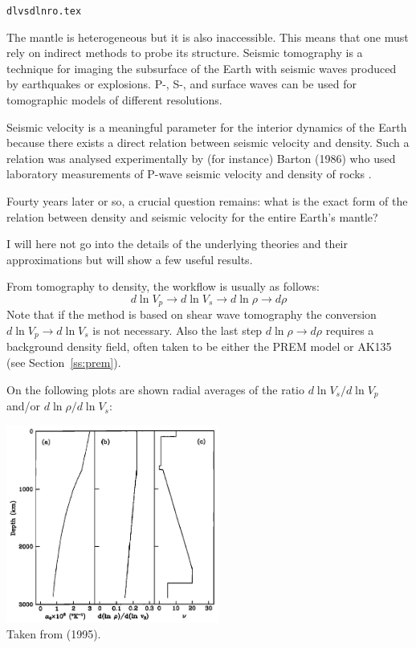 \begin{flushright} {\tiny {\color{gray} \tt dlvsdlnro.tex}} \end{flushright}

The mantle is heterogeneous but it is also inaccessible. This means that 
one must rely on indirect methods 
to probe its structure. Seismic tomography is a technique for imaging 
the subsurface of the Earth with seismic waves produced by earthquakes or explosions. 
P-, S-, and surface waves can be used for tomographic models of different resolutions.

Seismic velocity is a meaningful parameter for the interior dynamics of the
Earth because there exists a direct relation between seismic velocity and density. 
Such a relation was analysed experimentally by (for instance) Barton (1986) who 
used laboratory measurements of P-wave seismic velocity and density of rocks \cite{bart86}. 

Fourty years later or so, a crucial question remains: what is the exact form of the 
relation between density and seismic velocity for the entire Earth's mantle?

I will here not go into the details of the underlying theories and 
their approximations but will show a few useful results. 

From tomography to density, the workflow is usually as follows:
\[
d \ln V_p \rightarrow d \ln V_s \rightarrow d \ln \rho \rightarrow d\rho
\]
Note that if the method is based on shear wave tomography the conversion $d \ln V_p \rightarrow d \ln V_s$
is not necessary. 
Also the last step $d \ln \rho \rightarrow d\rho$ requires a background density field, 
often taken to be either the PREM model or AK135 (see Section~\ref{ss:prem}). 

On the following plots are shown radial averages of the 
ratio $d \ln V_s/d\ln V_p$ and/or $d\ln \rho/d \ln V_s$:

\begin{center}
\includegraphics[width=7cm]{images/thermal_expansion/pape95}\\
{\captionfont Taken from \textcite{pape95} (1995).}
\end{center}

